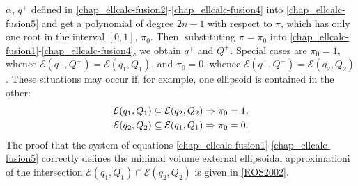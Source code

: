 \documentclass[letterpaper,10pt,english]{sphinxmanual}
\begin{document}
\(\alpha\), \(q^+\) defined in \eqref{chap_ellcalc-fusion2}-\eqref{chap_ellcalc-fusion4} into
\eqref{chap_ellcalc-fusion5} and get a polynomial of degree \(2n-1\) with respect to
\(\pi\), which has only one root in the interval \([0,1]\),
\(\pi_0\). Then, substituting \(\pi=\pi_0\) into
\eqref{chap_ellcalc-fusion1}-\eqref{chap_ellcalc-fusion4}, we obtain \(q^+\) and \(Q^+\). Special
cases are \(\pi_0=1\), whence
\({\mathcal E}(q^+,Q^+)={\mathcal E}(q_1,Q_1)\), and
\(\pi_0=0\), whence
\({\mathcal E}(q^+,Q^+)={\mathcal E}(q_2,Q_2)\). These situations
may occur if, for example, one ellipsoid is contained in the other:
\begin{gather}
\begin{split}{\mathcal E}(q_1,Q_1)\subseteq{\mathcal E}(q_2,Q_2) & \Rightarrow \pi_0 = 1,\\
{\mathcal E}(q_2,Q_2)\subseteq{\mathcal E}(q_1,Q_1) & \Rightarrow \pi_0 = 0.\end{split}\notag
\end{gather}
The proof that the system of equations \eqref{chap_ellcalc-fusion1}-\eqref{chap_ellcalc-fusion5} correctly
defines the minimal volume external ellipsoidal approximationi of the
intersection \({\mathcal E}(q_1,Q_1)\cap{\mathcal E}(q_2,Q_2)\) is
given in {\hyperref[chap_ellcalc:ros2002]{{[}ROS2002{]}}}.
\end{document}
